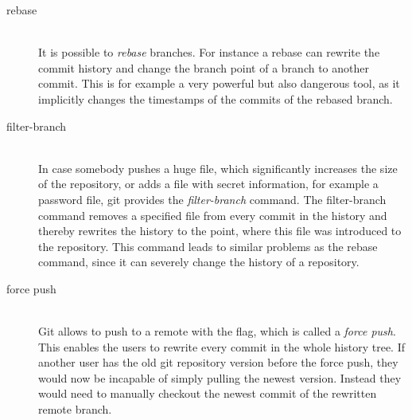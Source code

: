\begin{description}
    \item[rebase] \hfill \\
        It is possible to \emph{rebase} branches. For instance a rebase can rewrite the commit history and change the branch point of a branch to another commit.
        This is for example a very powerful but also dangerous tool, as it implicitly changes the timestamps of the commits of the rebased branch.

    \item[filter-branch] \hfill \\
        In case somebody pushes a huge file, which significantly increases the size of the repository, or adds a file with secret information, for example a password file, git provides the \emph{filter-branch} command.
        The filter-branch command removes a specified file from every commit in the history and thereby rewrites the history to the point, where this file was introduced to the repository.
        This command leads to similar problems as the rebase command, since it can severely change the history of a repository.

    \item[force push] \hfill \\
        Git allows to push to a remote with the  flag, which is called a \emph{force push}.
        This enables the users to rewrite every commit in the whole history tree.
        If another user has the old git repository version before the force push, they would now be incapable of simply pulling the newest version.
        Instead they would need to manually checkout the newest commit of the rewritten remote branch.

\end{description}
